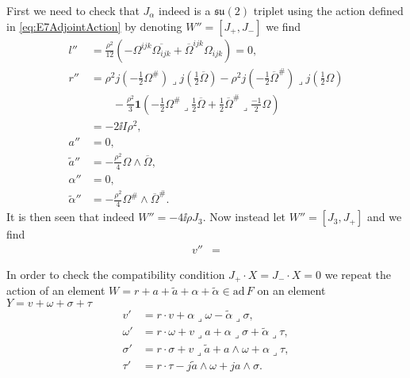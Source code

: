 First we need to check that $J_\alpha$ indeed is a $\mathfrak{su}(2)$ triplet using the action defined in \eqref{eq:E7AdjointAction} by denoting $W''=[J_+,J_-]$ we find 
\begin{equation}
    \begin{aligned}
        l''&= \frac{\rho^2}{12}(-\Omega^{ijk}\overbar{\Omega_{ijk}}+\overbar{\Omega}^{ijk}\Omega_{ijk}) = 0,\\
        r''&= \rho^2j(-\frac{1}{2}\Omega^{\#})\lrcorner j(\frac{1}{2}\overbar{\Omega})-\rho^2j(-\frac{1}{2}\overbar{\Omega}^{\#})\lrcorner j(\frac{1}{2}\Omega)\\
        &\qquad -\frac{\rho^2}{3}\mathbf{1}(-\frac{1}{2}\Omega^{\#}\lrcorner\frac{1}{2}\overbar{\Omega}+\frac{1}{2}\overbar{\Omega}^{\#}\lrcorner\frac{-1}{2}\Omega)\\
        &= -2\ii I\rho^2,\\
        a''&=0,\\
        \tilde{a}'' &= -\frac{\rho^2}{4}\Omega\wedge\overbar{\Omega},\\
        \alpha'' &= 0,\\
        \tilde{\alpha}'' &= -\frac{\rho^2}{4}\Omega^{\#}\wedge\overbar{\Omega}^{\#}.
    \end{aligned}
\end{equation}
It is then seen that indeed $W''=-4\ii\rho J_3$. Now instead let $W''=[J_3,J_+]$ and we find 
\begin{equation}
    \begin{aligned}
        v'' &= 
    \end{aligned}
\end{equation}





In order to check the compatibility condition $J_+\cdot X=J_-\cdot X=0$ we repeat the action of an element $W=r+a+\tilde{a}+\alpha+\tilde{\alpha}\in\text{ad}\,F$ on an element $Y=v+\omega+\sigma+\tau$
\begin{equation}\label{eq:E7action}
    \begin{aligned}
        v'&= r\cdot v+\alpha\lrcorner\omega-\tilde{\alpha}\lrcorner\sigma,\\
        \omega'&=r\cdot \omega+v\lrcorner a+\alpha\lrcorner\sigma+\tilde{\alpha}\lrcorner\tau,\\
        \sigma'&= r\cdot \sigma+v\lrcorner\tilde{a}+a\wedge\omega+\alpha\lrcorner\tau,\\
        \tau'&= r\cdot\tau-j\tilde{a}\wedge\omega+ja\wedge\sigma.
    \end{aligned}
\end{equation}

